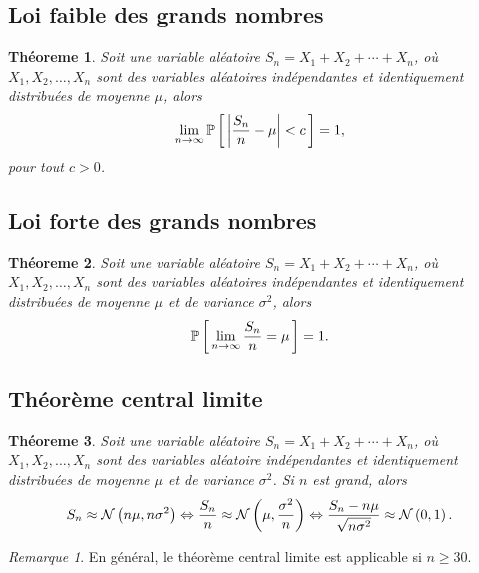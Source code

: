 \documentclass[11pt]{article}
\renewcommand\P[1]{%
	\ensuremath{%
		\mathbb{P}\left[\,#1\,\right]%
	}%
}%
\newcommand\Norm[2]{%
	\ensuremath{%
		\mathcal{N}\left(#1,#2\right)%
	}%
}%
\newtheorem{theoreme}{Théoreme}[section]
\theoremstyle{remark}
\newtheorem*{remark}{Remarque}
\theoremstyle{definition}
\begin{document}
\subsection{Loi faible des grands nombres}
\begin{theoreme}
	Soit une variable aléatoire $S_n=X_1+X_2+\cdots+X_n$, où $X_1,X_2,\dots,
	X_n$ sont des variables aléatoires indépendantes et identiquement
	distribuées de moyenne $\mu$, alors
	\begin{equation*}
		\lim_{n\rightarrow\infty}\P{\left\rvert
			\frac{S_n}{n}-\mu
		\right\rvert<c}=1,
	\end{equation*}
	pour tout $c>0$.
\end{theoreme}

\subsection{Loi forte des grands nombres}
\begin{theoreme}
	Soit une variable aléatoire $S_n=X_1+X_2+\cdots+X_n$, où $X_1,X_2,\dots,
	X_n$ sont des variables aléatoires indépendantes et identiquement
	distribuées de moyenne $\mu$ et de variance $\sigma^2$, alors
	\begin{equation*}
		\P{\lim_{n\rightarrow\infty}\frac{S_n}{n}=\mu}=1.
	\end{equation*}
\end{theoreme}

\subsection{Théorème central limite}
\begin{theoreme}
	Soit une variable aléatoire $S_n=X_1+X_2+\cdots+X_n$, où $X_1,X_2,\dots,
	X_n$ sont des variables aléatoire indépendantes et identiquement
	distribuées de moyenne $\mu$ et de variance $\sigma^2$. Si $n$ est
	\textit{grand}, alors
	\begin{equation*}
		S_n\approx\Norm{n\mu}{n\sigma^2}
		\Leftrightarrow
		\frac{S_n}{n}\approx\Norm{\mu}{\frac{\sigma^2}{n}}
		\Leftrightarrow
		\frac{S_n-n\mu}{\sqrt{n\sigma^2}}\approx\Norm{0}{1}.
	\end{equation*}
\end{theoreme}

\begin{remark}
	En général, le théorème central limite est applicable si $n\geq 30$.
\end{remark}
\end{document}
